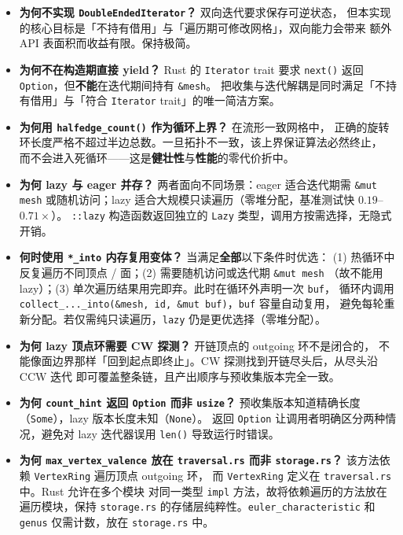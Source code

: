 \documentclass[11pt,a4paper]{article}
\begin{document}
\begin{itemize}
  \item \textbf{为何不实现 \texttt{DoubleEndedIterator}？} 双向迭代要求保存可逆状态，
        但本实现的核心目标是「不持有借用」与「遍历期可修改网格」，双向能力会带来
        额外 API 表面积而收益有限。保持极简。
  \item \textbf{为何不在构造期直接 yield？} Rust 的 \texttt{Iterator} trait 要求
        \texttt{next()} 返回 \texttt{Option}，但\textbf{不能}在迭代期间持有 \texttt{\&mesh}。
        把收集与迭代解耦是同时满足「不持有借用」与「符合 \texttt{Iterator} trait」的唯一简洁方案。
  \item \textbf{为何用 \texttt{halfedge\_count()} 作为循环上界？} 在流形一致网格中，
        正确的旋转环长度严格不超过半边总数。一旦拓扑不一致，该上界保证算法必然终止，
        而不会进入死循环——这是\textbf{健壮性}与\textbf{性能}的零代价折中。
  \item \textbf{为何 lazy 与 eager 并存？} 两者面向不同场景：eager 适合迭代期需 \texttt{\&mut mesh}
        或随机访问；lazy 适合大规模只读遍历（零堆分配，基准测试快 $0.19$--$0.71\times$）。
        \texttt{::lazy} 构造函数返回独立的 \texttt{Lazy} 类型，调用方按需选择，无隐式开销。
  \item \textbf{何时使用 \texttt{*\_into} 内存复用变体？} 当满足\textbf{全部}以下条件时优选：
        (1) 热循环中反复遍历不同顶点 / 面；(2) 需要随机访问或迭代期 \texttt{\&mut mesh}
        （故不能用 lazy）；(3) 单次遍历结果用完即弃。此时在循环外声明一次 \texttt{buf}，
        循环内调用 \texttt{collect\_...\_into(\&mesh, id, \&mut buf)}，\texttt{buf} 容量自动复用，
        避免每轮重新分配。若仅需纯只读遍历，\texttt{lazy} 仍是更优选择（零堆分配）。
  \item \textbf{为何 lazy 顶点环需要 CW 探测？} 开链顶点的 outgoing 环不是闭合的，
        不能像面边界那样「回到起点即终止」。CW 探测找到开链尽头后，从尽头沿 CCW 迭代
        即可覆盖整条链，且产出顺序与预收集版本完全一致。
  \item \textbf{为何 \texttt{count\_hint} 返回 \texttt{Option} 而非 \texttt{usize}？}
        预收集版本知道精确长度（\texttt{Some}），lazy 版本长度未知（\texttt{None}）。
        返回 \texttt{Option} 让调用者明确区分两种情况，避免对 lazy 迭代器误用
        \texttt{len()} 导致运行时错误。
  \item \textbf{为何 \texttt{max\_vertex\_valence} 放在 \texttt{traversal.rs} 而非
        \texttt{storage.rs}？} 该方法依赖 \texttt{VertexRing} 遍历顶点 outgoing 环，
        而 \texttt{VertexRing} 定义在 \texttt{traversal.rs} 中。Rust 允许在多个模块
        对同一类型 \texttt{impl} 方法，故将依赖遍历的方法放在遍历模块，保持
        \texttt{storage.rs} 的存储层纯粹性。\texttt{euler\_characteristic} 和
        \texttt{genus} 仅需计数，放在 \texttt{storage.rs} 中。
\end{itemize}
\end{document}

